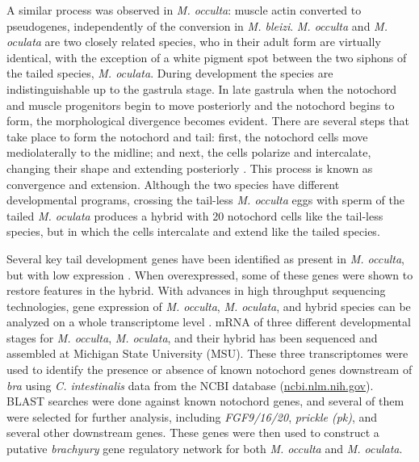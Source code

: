 A similar process was observed in \textit{M. occulta}: muscle actin converted to pseudogenes, independently of the conversion in \textit{M. bleizi}.
\textit{M. occulta} and \textit{M. oculata} are two closely related species, who in their adult form are virtually identical, with the exception of a white pigment spot between the two siphons of the tailed species, \textit{M. oculata}. During development the species are indistinguishable up to the gastrula stage. In late gastrula when the notochord and muscle progenitors begin to move posteriorly \cite{swalla_novel_1993} and the notochord begins to form, the morphological divergence becomes evident. There are several steps that take place to form the notochord and tail: first, the notochord cells move mediolaterally to the midline; and next, the cells polarize and intercalate, changing their shape and extending posteriorly \cite{keller_mechanisms_2000, jiang_ascidian_2005,stemple_structure_2005}. This process is known as convergence and extension. Although the two species have different developmental programs, crossing the tail-less \textit{M. occulta} eggs with sperm of the tailed \textit{M. oculata} produces a hybrid with 20 notochord cells like the tail-less species, but in which the cells intercalate and extend like the tailed species.  

Several key tail development genes have been identified as present in \textit{M. occulta}, but with low expression \cite{swalla_interspecific_1990,jeffery_factors_1992,swalla_novel_1993}. When overexpressed, some of these genes were shown to restore features in the hybrid. With advances in high throughput sequencing technologies, gene expression of \textit{M. occulta}, \textit{M. oculata}, and hybrid species can be analyzed on a whole transcriptome level \cite{gyoja_analysis_2007,pickrell_variation_2010}. mRNA of three different developmental stages for \textit{M. occulta}, \textit{M. oculata}, and their hybrid has been sequenced and assembled at Michigan State University (MSU). These three transcriptomes were used to identify the presence or absence of known notochord genes downstream of \textit{bra} using \textit{C. intestinalis} data from the NCBI database (\url{ncbi.nlm.nih.gov}). BLAST searches were done against known notochord genes, and several of them were selected for further analysis, including \textit{FGF9/16/20}, \textit{prickle (pk)}, and several other downstream genes.  These genes were then used to construct a putative \textit{brachyury} gene regulatory network for both \textit{M. occulta} and \textit{M. oculata}. 

